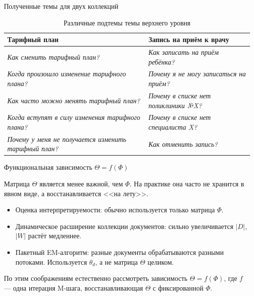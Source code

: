 \begin{frame}{Полученные темы для двух коллекций}

\begin{table}[!h]
\begin{tabularx}{\textwidth}{|X|X|}
  \hline
  \textbf{Тарифный план} & \textbf{Запись на приём к врачу} \\
  \hline
  \textsl{Как сменить тарифный план?} &   \textsl{Как записать на приём ребёнка?}\\
  \textsl{Когда произошло изменение тарифного плана?} &   \textsl{Почему я не могу записаться на приём?}\\
  \textsl{Как часто можно менять тарифный план?} &  \textsl{Почему в списке нет поликлиники №X?} \\
  \textsl{Когда вступят в силу изменения тарифного плана?} &    \textsl{Почему в списке нет специалиста X?} \\
  \textsl{Почему у меня не получается изменить тарифный план?} & \textsl{Как отменить запись?}\\
  \hline
\end{tabularx}
\caption{Различные подтемы темы верхнего уровня}
\label{topic_subtopic}
\end{table}

\end{frame}




\begin{frame}{Функциональная зависимость $\Theta = f(\Phi)$}

Матрица $\Theta$ является менее важной, чем $\Phi$. На практике она часто не хранится в явном виде, а восстанавливается <<на лету>>.

\begin{itemize}
\item Оценка интерпретируемости: обычно используется только матрица $\Phi$.

\item Динамическое расширение коллекции документов: сильно увеличивается $|D|$, $|W|$ растёт медленнее.

\item Пакетный EM-алгоритм: разные документы обрабатываются разными потоками. Используется $\theta_d$, а не матрица $\Theta$ целиком.
\end{itemize}

\bigskip
По этим соображениям естественно рассмотреть зависимость $\Theta = f(\Phi)$, где $f$ --- одна итерация M-шага, восстанавливающая $\Theta$ с фиксированной $\Phi$.

\end{frame}

